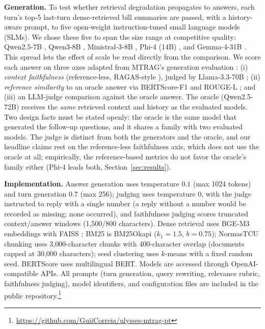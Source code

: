 \documentclass[conference]{IEEEtran}
\begin{document}
\textbf{Generation.} To test whether retrieval degradation propagates to answers,
each turn's top-5 last-turn dense-retrieved bill summaries are passed, with a
history-aware prompt, to five open-weight instruction-tuned small language
models (SLMs). We
chose these five to span the size range at competitive quality: Qwen2.5-7B
\cite{Qwen2024Qwen25}, Qwen3-8B \cite{Yang2025Qwen3}, Ministral-3-8B
\cite{Mistral2026Ministral3}, Phi-4 (14B)
\cite{Abdin2024Phi4}, and Gemma-4-31B \cite{Gemma2026Gemma4}. This spread lets the effect of scale be
read directly from the comparison. We score each answer on three axes adapted
from MTRAG's generation evaluation \cite{Katsis2025MTRAG}: (i) \emph{context
faithfulness} (reference-less, RAGAS-style \cite{Es2024RAGAS}), judged by
Llama-3.3-70B \cite{Grattafiori2024Llama3}; (ii) \emph{reference similarity} to
an oracle answer via BERTScore-F1
\cite{Zhang2020BERTScore} and ROUGE-L \cite{Lin2004ROUGE}; and (iii) an LLM-judge
comparison against the oracle answer. The oracle (Qwen2.5-72B) receives the
\emph{same} retrieved context and history as the evaluated models. Two design
facts must be stated openly: the oracle is the same model that generated the
follow-up questions, and it shares a family with two evaluated models. The judge
is distinct from both the generators and the oracle, and our headline claims rest
on the reference-less faithfulness axis, which does not use the oracle at all;
empirically, the reference-based metrics do not favor the oracle's family either
(Phi-4 leads both, Section~\ref{sec:results}).

\textbf{Implementation.} Answer generation uses temperature $0.1$ (max 1024
tokens) and turn generation $0.7$ (max 256); judging uses temperature $0$, with
the judge instructed to reply with a single number (a reply without a number
would be recorded as missing; none occurred), and faithfulness judging scores
truncated context/answer windows (1{,}500/800 characters). Dense retrieval uses BGE-M3 embeddings with FAISS
\cite{Douze2024Faiss}; BM25 is BM25Okapi ($k_1{=}1.5$, $b{=}0.75$); NormasTCU
chunking uses 3{,}000-character chunks with 400-character overlap (documents
capped at 30{,}000 characters); seed clustering
uses $k$-means with a fixed random seed. BERTScore uses multilingual BERT. Models
are accessed through OpenAI-compatible APIs. All prompts (turn generation, query
rewriting, relevance rubric, faithfulness judging), model identifiers, and
configuration files are included in the public
repository.\footnote{\url{https://github.com/GuiiCorreia/ulysses-mtrag-pt}}
\end{document}
